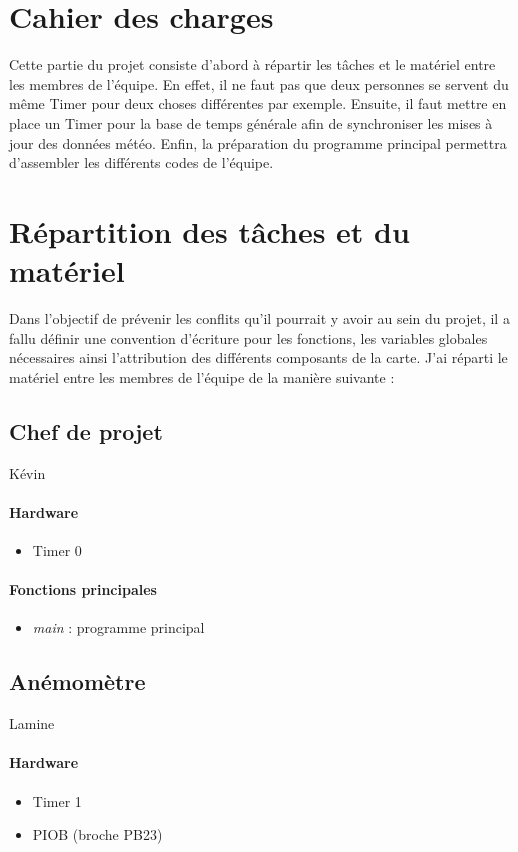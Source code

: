 \documentclass[a4paper]{report}
\begin{document}
\section{Cahier des charges}
Cette partie du projet consiste d'abord à répartir les tâches et le matériel entre les membres de l'équipe.
En effet, il ne faut pas que deux personnes se servent du même Timer pour deux choses différentes par exemple.
Ensuite, il faut mettre en place un Timer pour la base de temps générale afin de synchroniser les mises à jour des données météo.
Enfin, la préparation du programme principal permettra d'assembler les différents codes de l'équipe.

\section{Répartition des tâches et du matériel}
Dans l'objectif de prévenir les conflits qu'il pourrait y avoir au sein du projet, il a fallu définir une convention d'écriture pour les fonctions, les variables globales nécessaires ainsi l'attribution des différents composants de la carte.
J'ai réparti le matériel entre les membres de l'équipe de la manière suivante :

\subsection{Chef de projet}
Kévin 
\paragraph{Hardware}
\begin{itemize}
\item Timer 0
\end{itemize}
\paragraph{Fonctions principales}
\begin{itemize}
\item \emph{main} : programme principal
\end{itemize}

\subsection{Anémomètre}
Lamine 
\paragraph{Hardware}
\begin{itemize}
\item Timer 1
\item PIOB (broche PB23)
\end{itemize}
\end{document}
